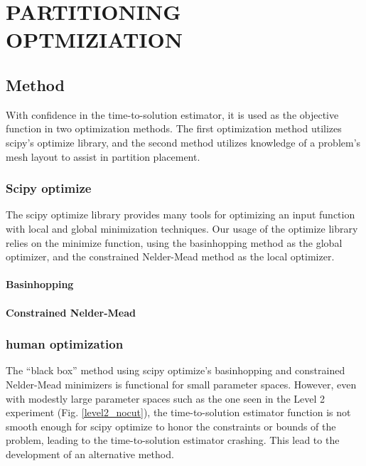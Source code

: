 %
%
%
%



\chapter{PARTITIONING OPTMIZIATION \label{cha:optimization}}
\section{Method}
With confidence in the time-to-solution estimator, it is used as the objective function in two optimization methods. The first optimization method utilizes scipy's optimize library, and the second method utilizes knowledge of a problem's mesh layout to assist in partition placement.
\subsection{Scipy optimize}
  The scipy optimize library provides many tools for optimizing an input function with local and global minimization techniques. Our usage of the optimize library relies on the minimize function, using the basinhopping method as the global optimizer, and the constrained Nelder-Mead method as the local optimizer.
  
\subsubsection{Basinhopping\cite{basinhoppingwales}}
  
\subsubsection{Constrained Nelder-Mead}
  
\subsection{human optimization}
  
  The ``black box'' method using scipy optimize's basinhopping and constrained Nelder-Mead minimizers is functional for small parameter spaces. However, even with modestly large parameter spaces such as the one seen in the Level 2 experiment (Fig. \ref{level2_nocut}), the time-to-solution estimator function is not smooth enough for scipy optimize to honor the constraints or bounds of the problem, leading to the time-to-solution estimator crashing. This lead to the development of an alternative method.  

